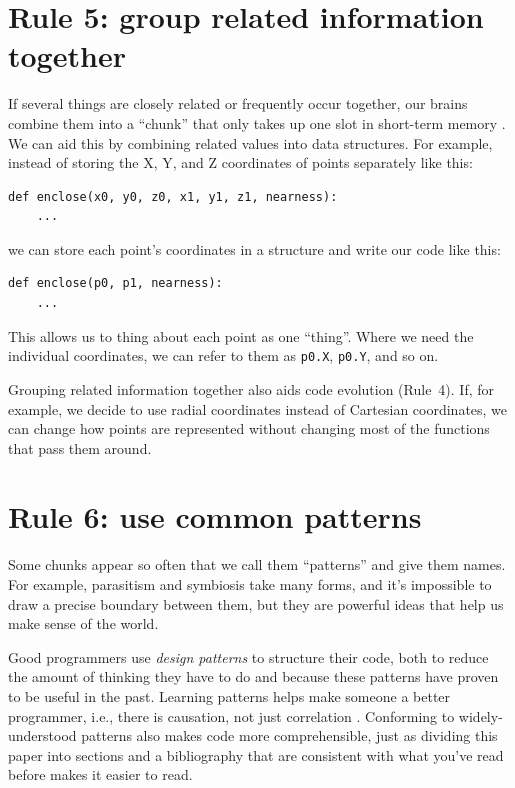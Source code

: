 \documentclass[10pt,letterpaper]{article}
\begin{document}
\section*{Rule 5: group related information together}

If several things are closely related or frequently occur together,
our brains combine them into a ``chunk''
that only takes up one slot in short-term memory \cite{Thalmann2019}.
We can aid this by combining related values into data structures.
For example,
instead of storing the X, Y, and Z coordinates of points separately like this:

\begin{lstlisting}
def enclose(x0, y0, z0, x1, y1, z1, nearness):
    ...
\end{lstlisting}

\noindent
we can store each point's coordinates in a structure
and write our code like this:

\begin{lstlisting}
def enclose(p0, p1, nearness):
    ...
\end{lstlisting}

\noindent
This allows us to thing about each point as one ``thing''.
Where we need the individual coordinates,
we can refer to them as \texttt{p0.X}, \texttt{p0.Y}, and so on.

Grouping related information together also aids code evolution (Rule~4).
If, for example, we decide to use radial coordinates instead of Cartesian coordinates,
we can change how points are represented without changing most of the functions that pass them around.

\section*{Rule 6: use common patterns}

Some chunks appear so often that we call them ``patterns'' and give them names.
For example,
parasitism and symbiosis take many forms,
and it's impossible to draw a precise boundary between them,
but they are powerful ideas that help us make sense of the world.

Good programmers use \emph{design patterns} to structure their code,
both to reduce the amount of thinking they have to do
and because these patterns have proven to be useful in the past.
Learning patterns helps make someone a better programmer,
i.e.,
there is causation, not just correlation \cite{Tichy2010}.
Conforming to widely-understood patterns also makes code more comprehensible,
just as dividing this paper into sections and a bibliography
that are consistent with what you've read before
makes it easier to read.
\end{document}
